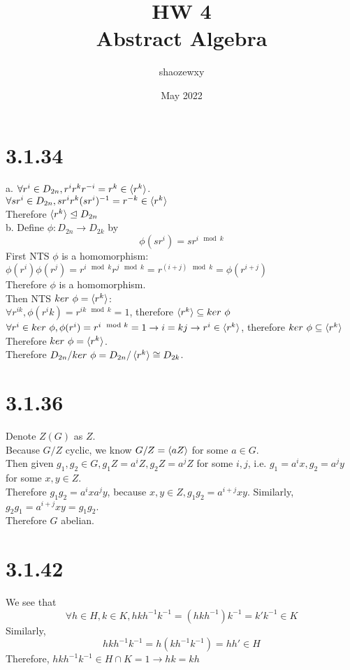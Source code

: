\documentclass{article}
\title{HW 4\\
\large{Abstract Algebra}}
\author{shaozewxy }
\date{May 2022}
\begin{document}
\maketitle
\setcounter{secnumdepth}{0}
\section{3.1.34}
a. $\forall r^i \in D_{2n}, r^ir^kr^{-i} = r^k \in \braket{r^k}$.\\
$\forall sr^i \in D_{2n}, sr^ir^k(sr^i)^{-1} = r^{-k} \in \braket{r^k}$\\
Therefore $\braket{r^k} \trianglelefteq D_{2n}$\\
b. Define $\phi: D_{2n} \rightarrow D_{2k}$ by
\begin{equation*}
    \phi(sr^i) = sr^{i\mod k}
\end{equation*}
First NTS $\phi$ is a homomorphism:\\
$\phi(r^i)\phi(r^j) = r^{i\mod k}r^{j\mod k} = r^{(i+j)\mod k} = \phi(r^{i+j})$\\
Therefore $\phi$ is a homomorphism.\\
Then NTS $ker\ \phi = \braket{r^k}$:\\
$\forall r^{ik}, \phi(r^ik) = r^{ik\mod k} = 1$, therefore $\braket{r^k} \subseteq ker\ \phi$\\
$\forall r^i \in ker\ \phi, \phi(r^i) = r^{i\mod k} = 1 \rightarrow i = kj \rightarrow r^i \in \braket{r^k}$, therefore $ker\ \phi \subseteq \braket{r^k}$\\
Therefore $ker\ \phi = \braket{r^k}$.\\
Therefore $D_{2n}/ker\ \phi = D_{2n}/\braket{r^k} \cong D_{2k}$.
\section{3.1.36}
Denote $Z(G)$ as $Z$.\\
Because $G/Z$ cyclic, we know $G/Z = \braket{aZ}$ for some $a \in G$.\\
Then given $g_1, g_2 \in G, g_1Z = a^iZ, g_2Z = a^jZ$ for some $i, j$, i.e. $g_1 = a^ix, g_2 = a^jy$ for some $x, y \in Z$.\\
Therefore $g_1g_2 = a^ixa^jy$, because $x, y \in Z, g_1g_2 = a^{i+j}xy$. Similarly, $g_2g_1 = a^{i+j}xy = g_1g_2$.\\
Therefore $G$ abelian.
\section{3.1.42}
We see that
\begin{equation*}
    \forall h \in H, k \in K, hkh^{-1}k^{-1} = (hkh^{-1})k^{-1} = k'k^{-1} \in K
\end{equation*}
Similarly,
\begin{equation*}
    hkh^{-1}k^{-1} = h(kh^{-1}k^{-1}) = hh' \in H
\end{equation*}
Therefore, $hkh^{-1}k^{-1} \in H \cap K = 1 \rightarrow hk = kh$
\end{document}
